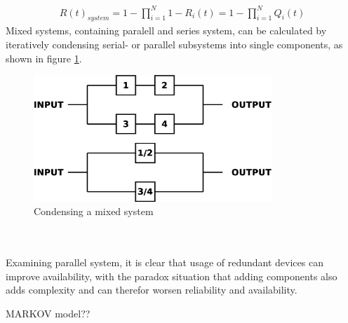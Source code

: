 \begin{align}\label{parallelSysEqu}
 R(t)_{system} = 1 - \prod_{i=1}^{N} 1- R_{i}(t) = 1 - \prod_{i=1}^{N} Q_{i}(t)
\end{align}
Mixed systems, containing paralell and series system, can be calculated by iteratively condensing serial- or parallel subsystems into single components,
as shown in figure \ref{fig:mixedSys}.
\begin{figure}
    \centering
    \includegraphics[width=0.8\textwidth]{figures/mixedSys.eps}
    \caption{Condensing a mixed system}
    \label{fig:mixedSys}
\end{figure}
\\
\\
Examining parallel system, it is clear that usage of redundant devices can improve availability, with the paradox situation that adding components also adds
complexity and can therefor worsen reliability and availability.


MARKOV model??